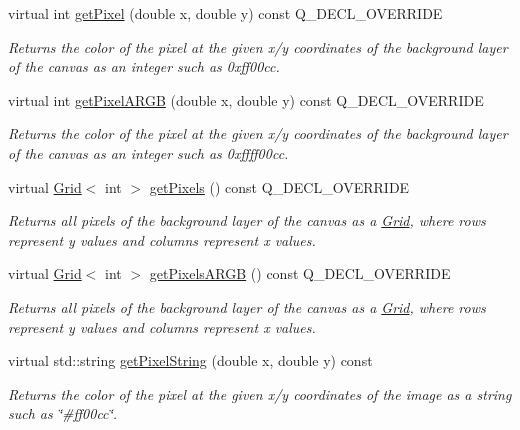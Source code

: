 \begin{DoxyCompactItemize}
virtual int \mbox{\hyperlink{classGCanvas_a076754305680c65782a00ddd3c77b50b}{get\+Pixel}} (double x, double y) const Q\+\_\+\+D\+E\+C\+L\+\_\+\+O\+V\+E\+R\+R\+I\+DE
\begin{DoxyCompactList}\small\item\em Returns the color of the pixel at the given x/y coordinates of the background layer of the canvas as an integer such as 0xff00cc. \end{DoxyCompactList}\item 
virtual int \mbox{\hyperlink{classGCanvas_ac1016456426446714a53d29da622f2ec}{get\+Pixel\+A\+R\+GB}} (double x, double y) const Q\+\_\+\+D\+E\+C\+L\+\_\+\+O\+V\+E\+R\+R\+I\+DE
\begin{DoxyCompactList}\small\item\em Returns the color of the pixel at the given x/y coordinates of the background layer of the canvas as an integer such as 0xffff00cc. \end{DoxyCompactList}\item 
virtual \mbox{\hyperlink{classGrid}{Grid}}$<$ int $>$ \mbox{\hyperlink{classGCanvas_a430b4965720f3b35f10062a252883e75}{get\+Pixels}} () const Q\+\_\+\+D\+E\+C\+L\+\_\+\+O\+V\+E\+R\+R\+I\+DE
\begin{DoxyCompactList}\small\item\em Returns all pixels of the background layer of the canvas as a \mbox{\hyperlink{classGrid}{Grid}}, where rows represent y values and columns represent x values. \end{DoxyCompactList}\item 
virtual \mbox{\hyperlink{classGrid}{Grid}}$<$ int $>$ \mbox{\hyperlink{classGCanvas_aca5a19f5f53c5cd29b832a769fde4f68}{get\+Pixels\+A\+R\+GB}} () const Q\+\_\+\+D\+E\+C\+L\+\_\+\+O\+V\+E\+R\+R\+I\+DE
\begin{DoxyCompactList}\small\item\em Returns all pixels of the background layer of the canvas as a \mbox{\hyperlink{classGrid}{Grid}}, where rows represent y values and columns represent x values. \end{DoxyCompactList}\item 
virtual std\+::string \mbox{\hyperlink{classGDrawingSurface_a8da04ef488ec5fa498fbbffaf50928fd}{get\+Pixel\+String}} (double x, double y) const
\begin{DoxyCompactList}\small\item\em Returns the color of the pixel at the given x/y coordinates of the image as a string such as \char`\"{}\#ff00cc\char`\"{}. \end{DoxyCompactList}\item 

\end{DoxyCompactItemize}
